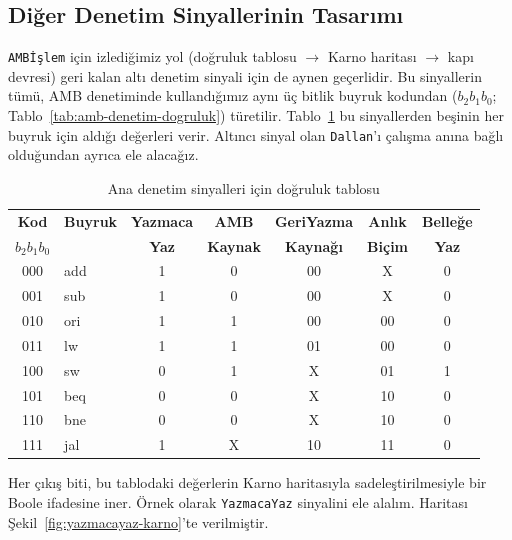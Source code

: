 \subsection{Diğer Denetim Sinyallerinin Tasarımı}
\label{subsec:ana-denetim}

\texttt{AMBİşlem} için izlediğimiz yol (doğruluk tablosu $\rightarrow$ Karno haritası $\rightarrow$ kapı devresi) geri kalan altı denetim sinyali için de aynen geçerlidir. Bu sinyallerin tümü, AMB denetiminde kullandığımız aynı üç bitlik buyruk kodundan ($b_2 b_1 b_0$; Tablo~\ref{tab:amb-denetim-dogruluk}) türetilir. Tablo~\ref{tab:ana-denetim-dogruluk} bu sinyallerden beşinin her buyruk için aldığı değerleri verir. Altıncı sinyal olan \texttt{Dallan}'ı çalışma anına bağlı olduğundan ayrıca ele alacağız.

\begin{table}[htbp]
\centering
\caption{Ana denetim sinyalleri için doğruluk tablosu}
\label{tab:ana-denetim-dogruluk}
\small
\begin{tabular}{cl|c|c|c|c|c}
\toprule
\textbf{Kod} & \textbf{Buyruk} & \textbf{Yazmaca} & \textbf{AMB} & \textbf{GeriYazma} & \textbf{Anlık} & \textbf{Belleğe} \\
$b_2b_1b_0$ & & \textbf{Yaz} & \textbf{Kaynak} & \textbf{Kaynağı} & \textbf{Biçim} & \textbf{Yaz} \\
\midrule
000 & add  & 1 & 0 & 00 & X  & 0 \\
001 & sub  & 1 & 0 & 00 & X  & 0 \\
010 & ori  & 1 & 1 & 00 & 00 & 0 \\
011 & lw   & 1 & 1 & 01 & 00 & 0 \\
100 & sw   & 0 & 1 & X  & 01 & 1 \\
101 & beq  & 0 & 0 & X  & 10 & 0 \\
110 & bne  & 0 & 0 & X  & 10 & 0 \\
111 & jal  & 1 & X & 10 & 11 & 0 \\
\bottomrule
\end{tabular}
\end{table}

Her çıkış biti, bu tablodaki değerlerin Karno haritasıyla sadeleştirilmesiyle bir Boole ifadesine iner. Örnek olarak \texttt{YazmacaYaz} sinyalini ele alalım. Haritası Şekil~\ref{fig:yazmacayaz-karno}'te verilmiştir.

